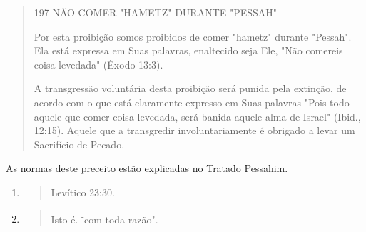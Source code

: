 \begin{quote}
197 NÃO COMER "HAMETZ" DURANTE "PESSAH"

Por esta proibição somos proibidos de comer "hametz" durante "Pes­sah".
Ela está expressa em Suas palavras, enaltecido seja Ele, "Não comereis
coisa levedada" (Êxodo 13:3).

A transgressão voluntária desta proibição será punida pela extinção, de
acordo com o que está claramente expresso em Suas palavras "Pois todo
aquele que comer coisa levedada, será banida aquele alma de Israel"
(Ibid., 12:15). Aquele que a transgredir involuntariamente é obrigado a
levar um Sa­crifício de Pecado.
\end{quote}

As normas deste preceito estão explicadas no Tratado Pessahim.

\begin{enumerate}
\def\labelenumi{\arabic{enumi}.}
\setcounter{enumi}{368}
\item
  \begin{quote}
  Levítico 23:30.
  \end{quote}
\item
  \begin{quote}
  Isto é. \textsuperscript{-}com toda razão".
  \end{quote}
\end{enumerate}

